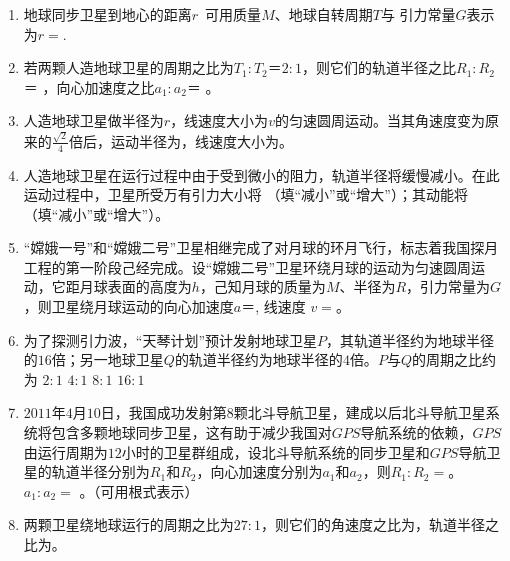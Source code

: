 \begin{enumerate}[leftmargin=0em]
\item 
{}
地球同步卫星到地心的距离$ r $ 可用质量$ M $、地球自转周期$ T $与 引力常量$ G $表示为$ r= $.


\item 
{}
若两颗人造地球卫星的周期之比为$ T_{1} : T_{2} $＝$ 2 : 1 $，则它们的轨道半径之比$ R_{1} : R_{2} $＝  ，向心加速度之比$ a_{1} : a_{2} $＝  。

\item 
{}
人造地球卫星做半径为$ r $，线速度大小为$ v $的匀速圆周运动。当其角速度变为原来的$ \frac{\sqrt{2}}{4} $倍后，运动半径为，线速度大小为。


\item 
{}
人造地球卫星在运行过程中由于受到微小的阻力，轨道半径将缓慢减小。在此运动过程中，卫星所受万有引力大小将  （填“减小”或“增大”）；其动能将  （填“减小”或“增大”）。

\item 
{}
“嫦娥一号”和“嫦娥二号”卫星相继完成了对月球的环月飞行，标志着我国探月工程的第一阶段己经完成。设“嫦娥二号”卫星环绕月球的运动为匀速圆周运动，它距月球表面的高度为$ h $，己知月球的质量为$ M $、半径为$ R $，引力常量为$ G $，则卫星绕月球运动的向心加速度$ a $＝, 线速度 $ v= $。 


\item 
{}
为了探测引力波，“天琴计划”预计发射地球卫星$ P $，其轨道半径约为地球半径的$ 16 $倍；另一地球卫星$ Q $的轨道半径约为地球半径的$ 4 $倍。$ P $与$ Q $的周期之比约为  
\fourchoices
{$ 2: 1 $}
{$ 4: 1 $}
{$ 8: 1 $}
{$ 16: 1 $}

\item 
{}
$ 2011 $年$ 4 $月$ 10 $日，我国成功发射第$ 8 $颗北斗导航卫星，建成以后北斗导航卫星系统将包含多颗地球同步卫星，这有助于减少我国对$ GPS $导航系统的依赖，$ GPS $由运行周期为$ 12 $小时的卫星群组成，设北斗导航系统的同步卫星和$ GPS $导航卫星的轨道半径分别为$ R_{1} $和$ R_{2} $，向心加速度分别为$ a_{1} $和$ a_{2} $，则$ R_{1}:R_{2}= $。$ a_{1}:a_{2}= $  。（可用根式表示）


\item 
{}
两颗卫星绕地球运行的周期之比为$ 27:1 $，则它们的角速度之比为，轨道半径之比为。




\end{enumerate}
